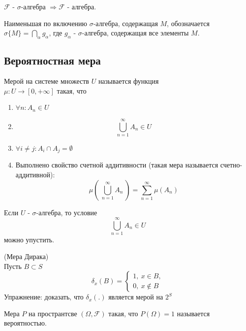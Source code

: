 \documentclass[a4paper, 12pt]{article}
\begin{document}
\begin{comm}
    $\mathcal{F}$ - $\sigma$-алгебра $\Rightarrow \mathcal{F}$ - алгебра.
\end{comm}
\begin{comm}
    Наименьшая по включению $\sigma$-алгебра, содержащая $M$, обозначается $\sigma\{M\}=\bigcap\limits_{\alpha}g_{\alpha}$, где $g_{\alpha}$ - $\sigma$-алгебра, содержащая все элементы $M$.
\end{comm}
\subsection{Вероятностная мера}
\begin{definition}
    Мерой на системе множеств $U$ называется функция\\ 
    $\mu: U\to [0,+\infty]$ такая, что
    \begin{enumerate}
        \item $\forall n: A_n\in U$
        \item \[\bigcup\limits_{n=1}^{\infty}A_n\in U\]
        \item $\forall i\ne j: A_i\cap A_j=\emptyset$
        \item Выполнено свойство счетной аддитивности (такая мера называется счетно-аддитивной):
        \[\mu\left(\ \bigcup\limits_{n=1}^{\infty}A_n\ \right)=\sum_{n=1}^{\infty}\mu(A_n)\]
    \end{enumerate}
\end{definition}
\begin{comm}
    Если $U$ - $\sigma$-алгебра, то условие
    \[\bigcup\limits_{n=1}^{\infty}A_n\in U\]
    можно упустить.
\end{comm}
\begin{example} (Мера Дирака)\\
    Пусть $B\subset S$
    \[\delta_x(B)=\begin{cases}
        1,\ x\in B,\\
        0,\ x\not\in B
    \end{cases}\]
    Упражнение: доказать, что $\delta_x(.)$ является мерой на $2^S$
\end{example}
\begin{definition}
    Мера $P$ на пространтсве $(\Omega, \mathcal{F})$ такая, что $P(\Omega)=1$ называется вероятностью.
\end{definition}
\end{document}
